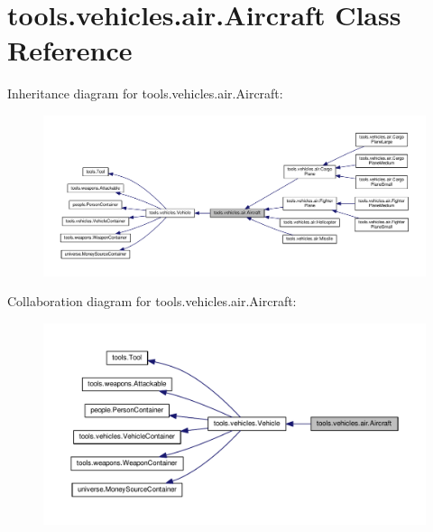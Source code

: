 \hypertarget{classtools_1_1vehicles_1_1air_1_1_aircraft}{}\section{tools.\+vehicles.\+air.\+Aircraft Class Reference}
\label{classtools_1_1vehicles_1_1air_1_1_aircraft}


Inheritance diagram for tools.\+vehicles.\+air.\+Aircraft\+:\nopagebreak
\begin{figure}[H]
\begin{center}
\leavevmode
\includegraphics[width=350pt]{classtools_1_1vehicles_1_1air_1_1_aircraft__inherit__graph}
\end{center}
\end{figure}


Collaboration diagram for tools.\+vehicles.\+air.\+Aircraft\+:\nopagebreak
\begin{figure}[H]
\begin{center}
\leavevmode
\includegraphics[width=350pt]{classtools_1_1vehicles_1_1air_1_1_aircraft__coll__graph}
\end{center}
\end{figure}
